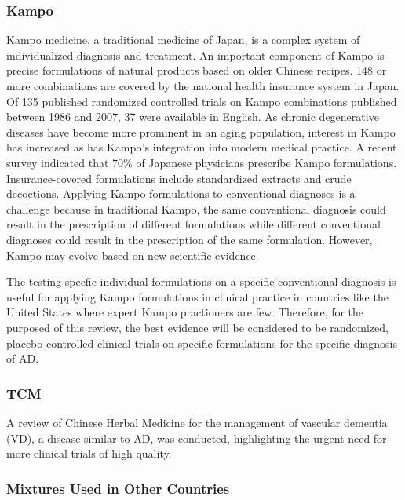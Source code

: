 \documentclass[twocolumn]{article}
\begin{document}
\subsubsection{Kampo}

Kampo medicine, a traditional medicine of Japan,
is a complex system of individualized diagnosis and treatment.
An important component of Kampo is precise formulations of natural products
based on older Chinese recipes.
148 or more combinations are covered by the national health insurance system in Japan.
Of 135 published randomized controlled trials on Kampo combinations
published between 1986 and 2007,
37 were available in English.
As chronic degenerative diseases have become more prominent in an aging population,
interest in Kampo has increased as has Kampo's integration into modern medical practice.
A recent survey indicated that 70\% of Japanese physicians prescribe Kampo formulations.
Insurance-covered formulations include standardized extracts and crude decoctions.
Applying Kampo formulations to conventional diagnoses is a challenge because
in traditional Kampo, the same conventional diagnosis could result in the prescription
of different formulations while different conventional diagnoses could result
in the prescription of the same formulation.
\cite{watanabe2011traditional}
However, Kampo may evolve based on new scientific evidence.
\cite{terasawa2004evidence}

The testing specfic individual formulations on a specific conventional diagnosis
is useful for applying Kampo formulations in clinical practice in
countries like the United States where expert Kampo practioners are few.
Therefore, for the purposed of this review, the best evidence will be considered
to be randomized, placebo-controlled clinical trials on specific formulations
for the specific diagnosis of AD.

\subsubsection{TCM}

A review of Chinese Herbal Medicine for the management of vascular dementia (VD),
a disease similar to AD,
was conducted, highlighting the urgent need for more clinical trials of high quality.
\cite{liu2008development}

\subsubsection{Mixtures Used in Other Countries}
\end{document}

